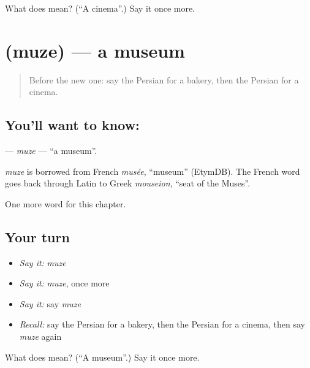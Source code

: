 \begin{tcolorbox}[breakable,colback=teal!4,colframe=teal!35!black,title={Before you move on}]
What does  mean? (\textquotedblleft{}A cinema\textquotedblright{}.) Say it once more.
\end{tcolorbox}
\section[\texorpdfstring{\fa{موزه} (muze)}{موزه (muze)}]{ (muze) — a museum}

\label{lesson:FA-C88-muze}



\begin{quote}
Before the new one: say the Persian for a bakery, then the Persian for a cinema.
\end{quote}

\subsection*{You'll want to know: }
\textbf{} — \emph{muze} — \textquotedblleft{}a museum\textquotedblright{}.

\begin{cousinweb}
\emph{muze} is borrowed from French \emph{musée}, \textquotedblleft{}museum\textquotedblright{} (EtymDB). The French word goes back through Latin to Greek \emph{mouseion}, \textquotedblleft{}seat of the Muses\textquotedblright{}.
\end{cousinweb}

\begin{grammarlens}[title={What you've built}]
One more word for this chapter.
\end{grammarlens}

\subsection*{Your turn}
\begin{itemize}
\raggedright
  \item \emph{Say it:} \emph{muze}
  \item \emph{Say it:} \emph{muze}, once more
  \item \emph{Say it:} say \emph{muze}
  \item \emph{Recall:} say the Persian for a bakery, then the Persian for a cinema, then say \emph{muze} again
\end{itemize}

\begin{tcolorbox}[breakable,colback=teal!4,colframe=teal!35!black,title={Before you move on}]
What does  mean? (\textquotedblleft{}A museum\textquotedblright{}.) Say it once more.
\end{tcolorbox}
